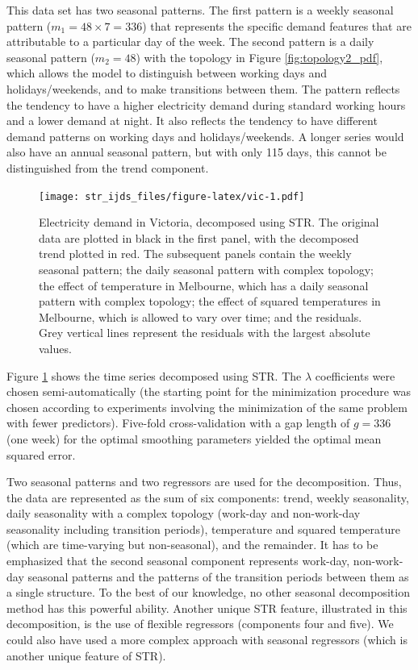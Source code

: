 \documentclass[11pt,a4paper,]{article}
\begin{document}
This data set has two seasonal patterns. The first pattern is a weekly seasonal pattern (\(m_1=48\times7=336\)) that represents the specific demand features that are attributable to a particular day of the week. The second pattern is a daily seasonal pattern (\(m_2=48\)) with the topology in Figure \ref{fig:topology2_pdf}, which allows the model to distinguish between working days and holidays/weekends, and to make transitions between them. The pattern reflects the tendency to have a higher electricity demand during standard working hours and a lower demand at night. It also reflects the tendency to have different demand patterns on working days and holidays/weekends. A longer series would also have an annual seasonal pattern, but with only 115 days, this cannot be distinguished from the trend component.

\begin{figure}
\centering
\texttt{[image: str\_ijds\_files/figure-latex/vic-1.pdf]}
\caption{\label{fig:vic}Electricity demand in Victoria, decomposed using STR. The original data are plotted in black in the first panel, with the decomposed trend plotted in red. The subsequent panels contain the weekly seasonal pattern; the daily seasonal pattern with complex topology; the effect of temperature in Melbourne, which has a daily seasonal pattern with complex topology; the effect of squared temperatures in Melbourne, which is allowed to vary over time; and the residuals. Grey vertical lines represent the residuals with the largest absolute values.}
\end{figure}

Figure \ref{fig:vic} shows the time series decomposed using STR.
The \(\lambda\) coefficients were chosen semi-automatically (the starting point for the minimization procedure was chosen according to experiments involving the minimization of the same problem with fewer predictors). Five-fold cross-validation with a gap length of \(g=336\) (one week) for the optimal smoothing parameters yielded the optimal mean squared error.

Two seasonal patterns and two regressors are used for the decomposition.
Thus, the data are represented as the sum of six components: trend, weekly seasonality, daily seasonality with a complex topology (work-day and non-work-day seasonality including transition periods), temperature and squared temperature (which are time-varying but non-seasonal), and the remainder. It has to be emphasized that the second seasonal component represents work-day, non-work-day seasonal patterns and the patterns of the transition periods between them as a single structure. To the best of our knowledge, no other seasonal decomposition method has this powerful ability. Another unique STR feature, illustrated in this decomposition, is the use of flexible regressors (components four and five). We could also have used a more complex approach with seasonal regressors (which is another unique feature of STR).
\end{document}
